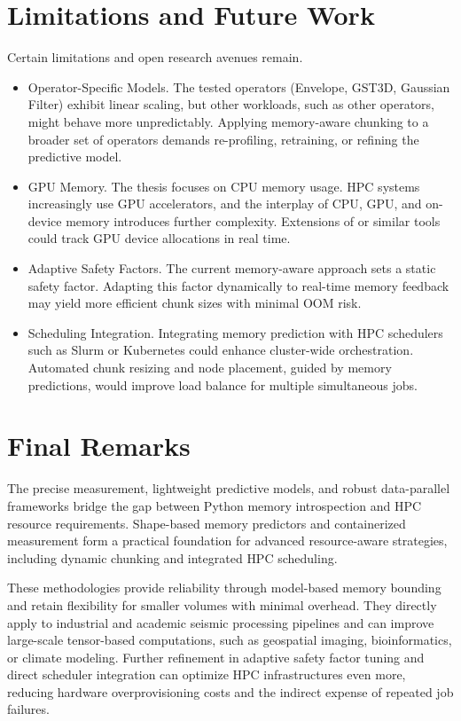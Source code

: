 \section{Limitations and Future Work}

Certain limitations and open research avenues remain.
\begin{itemize}
    \item Operator-Specific Models.
    The tested operators (Envelope, \ac{GST3D}, Gaussian Filter) exhibit linear scaling, but other workloads, such as other operators, might behave more unpredictably.
    Applying memory-aware chunking to a broader set of operators demands re-profiling, retraining, or refining the predictive model.
    \item \ac{GPU} Memory.
    The thesis focuses on \ac{CPU} memory usage.
    \ac{HPC} systems increasingly use \ac{GPU} accelerators, and the interplay of \ac{CPU}, \ac{GPU}, and on-device memory introduces further complexity.
    Extensions of \traceq or similar tools could track \ac{GPU} device allocations in real time.
    \item Adaptive Safety Factors.
    The current memory-aware approach sets a static safety factor.
    Adapting this factor dynamically to real-time memory feedback may yield more efficient chunk sizes with minimal \ac{OOM} risk.
    \item Scheduling Integration.
    Integrating memory prediction with \ac{HPC} schedulers such as Slurm or Kubernetes could enhance cluster-wide orchestration.
    Automated chunk resizing and node placement, guided by memory predictions, would improve load balance for multiple simultaneous jobs.
\end{itemize}

\section*{Final Remarks}

The precise measurement, lightweight predictive models, and robust data-parallel frameworks bridge the gap between Python memory introspection and \ac{HPC} resource requirements.
Shape-based memory predictors and containerized measurement form a practical foundation for advanced resource-aware strategies, including dynamic chunking and integrated \ac{HPC} scheduling.

These methodologies provide reliability through model-based memory bounding and retain flexibility for smaller volumes with minimal overhead.
They directly apply to industrial and academic seismic processing pipelines and can improve large-scale tensor-based computations, such as geospatial imaging, bioinformatics, or climate modeling.
Further refinement in adaptive safety factor tuning and direct scheduler integration can optimize \ac{HPC} infrastructures even more, reducing hardware overprovisioning costs and the indirect expense of repeated job failures.